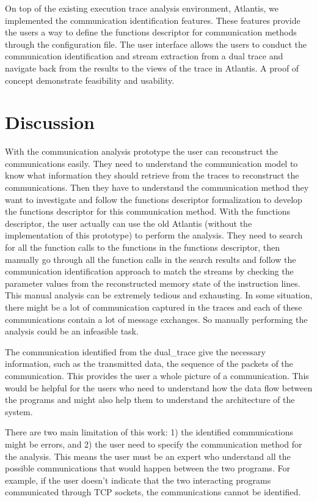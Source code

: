 \documentclass[12pt,oneside]{book}
\begin{document}
On top of the existing execution trace analysis environment, Atlantis, we implemented the communication identification features. These features provide the users a way to define the functions descriptor for communication methods through the configuration file. The user interface allows the users to conduct the communication identification and stream extraction from a dual trace and navigate back from the results to the views of the trace in Atlantis.  A proof of concept demonstrate feasibility and usability. 

\section{Discussion}
With the communication analysis prototype the user can reconstruct the communications easily. They need to understand the communication model to know what information they should retrieve from the traces to reconstruct the communications. Then they have to understand the communication method they want to investigate and follow the functions descriptor formalization to develop the functions descriptor for this communication method. With the functions descriptor, the user actually can use the old Atlantis (without the implementation of this prototype) to perform the analysis. They need to search for all the function calls to the functions in the functions descriptor, then manually go through all the function calls in the search results and follow the communication identification approach to match the streams by checking the parameter values from the reconstructed memory state of the instruction lines. This manual analysis can be extremely tedious and exhausting. In some situation, there might be a lot of communication captured in the traces and each of these communications contain a lot of message exchanges. So manually performing the analysis could be an infeasible task.

The communication identified from the dual\_trace give the necessary information, such as the transmitted data, the sequence of the packets of the communication. This provides the user a whole picture of a communication. This would be helpful for the users who need to understand how the data flow between the programs and might also help them to understand the architecture of the system. 

There are two main limitation of this work: 1) the identified communications might be errors, and 2) the user need to specify the communication method for the analysis. This means the user must be an expert who understand all the possible communications that would happen between the two programs. For example, if the user doesn't indicate that the two interacting programs communicated through TCP sockets, the communications cannot be identified. 
\end{document}
